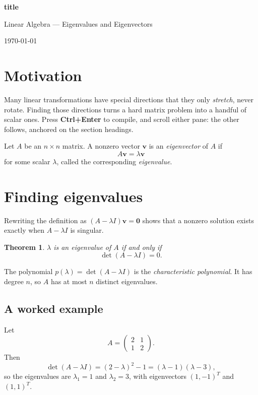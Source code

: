 \documentclass[11pt,a4paper]{article}
\theoremstyle{plain}
\newtheorem{theorem}{Theorem}[section]
\theoremstyle{remark}
\newcommand{\notesTitle}[2]{%
    \noindent{\color{accent}\rule{\linewidth}{3pt}}\par
    \vspace{1.2em}
    \begin{center}
        {\color{accentDark}\LARGE\bfseries #1}\par
        \vspace{0.5em}
        {\color{accent}\large #2}\par
        \vspace{0.4em}
        {\small \today}
    \end{center}
    \vspace{0.6em}
    \noindent{\color{accent}\rule{\linewidth}{1pt}}\par
    \vspace{1.5em}
}
\begin{document}
\notesTitle{{{title}}}{Linear Algebra --- Eigenvalues and Eigenvectors}

\section{Motivation}

Many linear transformations have special directions that they only \emph{stretch}, never rotate. Finding those directions turns a hard matrix problem into a handful of scalar ones. Press \textbf{Ctrl+Enter} to compile, and scroll either pane: the other follows, anchored on the section headings.

\begin{tcolorbox}[definitionBox, title=Definition 1.1]
Let $A$ be an $n \times n$ matrix. A nonzero vector $\mathbf{v}$ is an \emph{eigenvector} of $A$ if
\[ A\mathbf{v} = \lambda \mathbf{v} \]
for some scalar $\lambda$, called the corresponding \emph{eigenvalue}.
\end{tcolorbox}

\section{Finding eigenvalues}

Rewriting the definition as $(A - \lambda I)\mathbf{v} = \mathbf{0}$ shows that a nonzero solution exists exactly when $A - \lambda I$ is singular.

\begin{theorem}
$\lambda$ is an eigenvalue of $A$ if and only if
\[ \det(A - \lambda I) = 0. \]
\end{theorem}

\begin{tcolorbox}[noteBox, title=Note]
The polynomial $p(\lambda) = \det(A - \lambda I)$ is the \emph{characteristic polynomial}. It has degree $n$, so $A$ has at most $n$ distinct eigenvalues.
\end{tcolorbox}

\subsection{A worked example}

\begin{tcolorbox}[exampleBox, title=Example 2.1]
Let
\[ A = \begin{pmatrix} 2 & 1 \\ 1 & 2 \end{pmatrix}. \]
Then
\[ \det(A - \lambda I) = (2-\lambda)^2 - 1 = (\lambda - 1)(\lambda - 3), \]
so the eigenvalues are $\lambda_1 = 1$ and $\lambda_2 = 3$, with eigenvectors $(1,-1)^{T}$ and $(1,1)^{T}$.
\end{tcolorbox}
\end{document}
